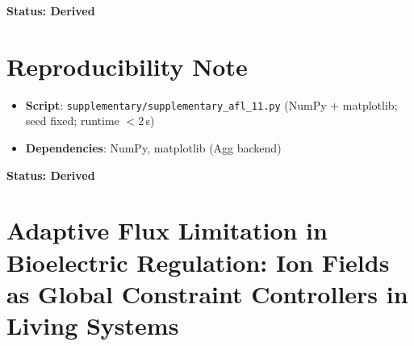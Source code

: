 \documentclass[12pt,a4paper]{article}
\begin{document}
\textbf{Status: Derived}

\section{Reproducibility Note}
\begin{itemize}
    \item \textbf{Script}: \texttt{supplementary/supplementary\_afl\_11.py} (NumPy + matplotlib; seed fixed; runtime $< 2$\,s)
    \item \textbf{Dependencies}: NumPy, matplotlib (Agg backend)
\end{itemize}
\textbf{Status: Derived}
\clearpage
\section*{Adaptive Flux Limitation in Bioelectric Regulation: Ion Fields as Global Constraint Controllers in Living Systems}




\end{document}
